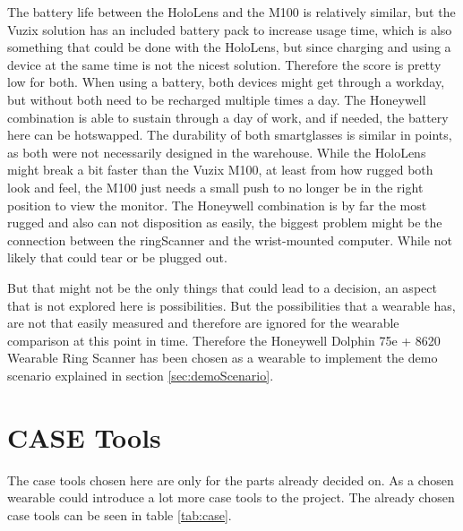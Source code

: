 The battery life between the HoloLens and the M100 is relatively similar, but the Vuzix solution has an included battery pack to increase usage time, which is also something that could be done with the HoloLens, but since charging and using a device at the same time is not the nicest solution. Therefore the score is pretty low for both. When using a \gls{battery}, both devices might get through a workday, but without both need to be recharged multiple times a day. The Honeywell combination is able to sustain through a day of work, and if needed, the battery here can be \gls{hotswap}ped. The durability of both \gls{smartglasses} is similar in points, as both were not necessarily designed in the warehouse. While the HoloLens might break a bit faster than the Vuzix M100, at least from how rugged both look and feel, the M100 just needs a small push to no longer be in the right position to view the monitor. The Honeywell combination is by far the most rugged and also can not disposition as easily, the biggest problem might be the connection between the \gls{ringScanner} and the wrist-mounted computer. While not likely that could tear or be plugged out.

But that might not be the only things that could lead to a decision, an aspect that is not explored here is possibilities. But the possibilities that a \gls{wearable} has, are not that easily measured and therefore are ignored for the wearable comparison at this point in time. Therefore the Honeywell Dolphin 75e + 8620 Wearable Ring Scanner has been chosen as a wearable to implement the demo scenario explained in section \ref{sec:demoScenario}.

\cleardoublepage

\section{CASE Tools}\label{sec:caseTools}
The \gls{case} tools chosen here are only for the parts already decided on. As a chosen wearable could introduce a lot more \gls{case} tools to the project. The already chosen \gls{case} tools can be seen in table \ref{tab:case}.

